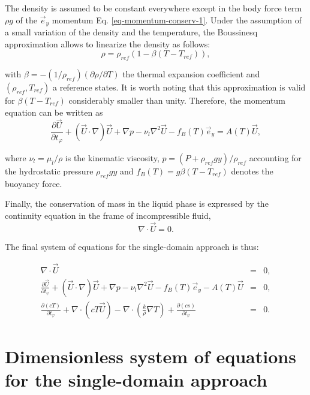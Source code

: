 \noindent The density is assumed to be constant everywhere except in the body force term $\rho g$ of the $\vec e_y$ momentum Eq. \ref{eq-momentum-conserv-1}.
Under the assumption of a small variation of the density and the temperature, the Boussinesq approximation allows to linearize the density as follows:
\begin{equation}
   \rho = \rho_{ref} (1 - \beta (T-T_{ref})),
\end{equation}

\noindent with $\beta = - (1/\rho_{ref}) (\partial \rho / \partial T)$ the thermal expansion coefficient and $(\rho_{ref},T_{ref})$ a reference states.
It is worth noting that this approximation is valid for $\beta (T - T_{ref})$ considerably smaller than unity.
Therefore, the momentum equation can be written as
\begin{equation}\label{eq-momentum-conserv}
  \frac{\partial \vec{U}}{\partial t_{\varphi}} +   {(\vec{U}\cdot\nabla ) \vec{U}} + \nabla p - \nu_{l}  {\nabla^2 \vec{U}} 
- f_B(T) \vec{e}_y= A(T) \vec{U},
\end{equation}

\noindent where  $\nu_l = \mu_l/\rho$ is the kinematic viscosity,  $p = (P + \rho_{ref} g y)/ \rho_{ref}$ accounting for the hydrostatic pressure $\rho_{ref} g y$ and $f_B(T) = g \beta (T-T_{ref})$ denotes the buoyancy force.

Finally, the conservation of mass in the liquid phase is expressed by the continuity equation in the frame of incompressible fluid,
\begin{equation}\label{eq-mass-conserv}
\nabla \cdot \vec{U} = 0.
\end{equation} 

\noindent The final system of equations for the single-domain approach is thus: 

\begin{eqnarray} 
	\nabla \cdot \vec{U} &=& 0, \\
	\frac{\partial \vec{U}}{\partial t_{\varphi}} +   {(\vec{U}\cdot\nabla ) \vec{U}} + \nabla p - \nu_{l}  {\nabla^2 \vec{U}} 
- f_B(T) \vec{e}_y - A(T) \vec{U} & = & 0, \\
	\frac{\partial \left(c T\right)}{\partial t_{\varphi}} + \nabla \cdot\left( c T \vec{U}\right) -
\nabla \cdot\left( \frac{k}{\rho} \nabla T \right) +  \frac{\partial \left(c s\right)}{\partial t_{\varphi}}  &=& 0.
\end{eqnarray}


\section{Dimensionless system of equations for the single-domain approach}\label{sec-eq-scaling}

